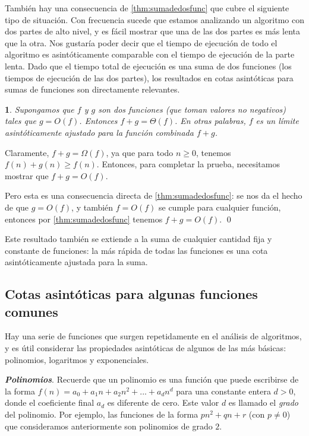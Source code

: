 \documentclass[a4paper, 12pt]{book}
\theoremstyle{dotless}
\newtheorem{theorem}{}[section]
\renewenvironment{proof}{\vspace{12pt}{\noindent\bfseries Demostración.}}{\qed\vspace{12pt}}
\begin{document}
También hay una consecuencia de \ref{thm:sumadedosfunc} que cubre el siguiente tipo de situación. Con frecuencia sucede que estamos analizando un algoritmo con dos partes de alto nivel, y es fácil mostrar que una de las dos partes es más lenta que la otra. Nos gustaría poder decir que el tiempo de ejecución de todo el algoritmo es asintóticamente comparable con el tiempo de ejecución de la parte lenta. Dado que el tiempo total de ejecución es una suma de dos funciones (los tiempos de ejecución de las dos partes), los resultados en cotas asintóticas para sumas de funciones son directamente relevantes.

\begin{theorem}
Supongamos que $f$ y $g$ son dos funciones (que toman valores no negativos) tales que $g = O(f)$. Entonces $f + g = \Theta(f)$. En otras palabras, $f$ es un límite asintóticamente ajustado para la función combinada $f + g$.
\end{theorem}

\begin{proof}
Claramente, $f + g = \Omega (f)$, ya que para todo $n ≥ 0$, tenemos $f (n) + g (n) ≥ f (n)$. Entonces, para completar la prueba, necesitamos mostrar que $f + g = O(f)$.

Pero esta es una consecuencia directa de \ref{thm:sumadedosfunc}: se nos da el hecho de que $g = O(f)$, y también $f = O (f)$ se cumple para cualquier función, entonces por \ref{thm:sumadedosfunc} tenemos $f + g = O(f)$. 
\end{proof}

Este resultado también se extiende a la suma de cualquier cantidad fija y constante de funciones: la más rápida de todas las funciones es una cota asintóticamente ajustada para la suma.

\subsection*{Cotas asintóticas para algunas funciones comunes}

Hay una serie de funciones que surgen repetidamente en el análisis de algoritmos, y es útil considerar las propiedades asintóticas de algunos de las más básicas: polinomios, logaritmos y exponenciales.

\textit{\textbf{Polinomios}}. Recuerde que un polinomio es una función que puede escribirse de la forma $f(n) = a_0 + a_1n + a_2n^2 + ... + a_dn^d$ para una constante entera $d>0$, donde el coeficiente final $a_d$ es diferente de cero. Este valor $d$ es llamado el \textit{grado} del polinomio. Por ejemplo, las funciones de la forma $pn^2 + qn + r$ (con $p \neq 0$) que consideramos anteriormente son polinomios de grado $2$.
\end{document}
